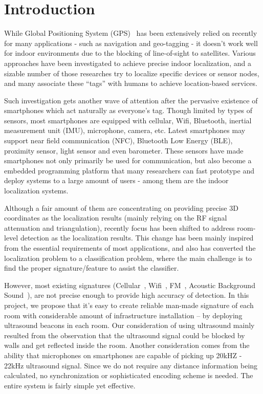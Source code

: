 \section{Introduction}
\label{sec:introduction}

While Global Positioning System (GPS)~\cite{hofmann1993global} has been extensively relied on recently for many applications - such as navigation and geo-tagging - it doesn't work well for indoor environments due to the blocking of line-of-sight to satellites. Various approaches have been investigated to achieve precise indoor localization, and a sizable number of those researches try to localize specific devices or sensor nodes, and many associate these ``tags'' with humans to achieve location-based services. 

Such investigation gets another wave of attention after the pervasive existence of smartphones which act naturally as everyone's tag. Though limited by types of sensors, most smartphones are equipped with cellular, Wifi, Bluetooth, inertial measurement unit (IMU), microphone, camera, etc. Latest smartphones may support near field communication (NFC), Bluetooth Low Energy (BLE), proximity sensor, light sensor and even barometer. These sensors have made smartphones not only primarily be used for communication, but also become a embedded programming platform that many researchers can fast prototype and deploy systems to a large amount of users - among them are the indoor localization systems.

Although a fair amount of them are concentrating on providing precise 3D coordinates as the localization results (mainly relying on the RF signal attenuation and triangulation), recently focus has been shifted to address room-level detection as the localization results. This change has been mainly inspired from the essential requirements of most applications, and also has converted the localization problem to a classification problem, where the main challenge is to find the proper signature/feature to assist the classifier.

However, most existing signatures (Cellular~\cite{otsason2005accurate}, Wifi~\cite{cheng2005accuracy}, FM~\cite{chen2012fm}, Acoustic Background Sound~\cite{tarzia2011indoor}), are not precise enough to provide high accuracy of detection. In this project, we propose that it's easy to create reliable man-made signature of each room with considerable amount of infrastructure installation -- by deploying ultrasound beacons in each room. Our consideration of using ultrasound mainly resulted from the observation that the ultrasound signal could be blocked by walls and get reflected inside the room. Another consideration comes from the ability that microphones on smartphones are capable of picking up 20kHZ - 22kHz ultrasound signal. Since we do not require any distance information being calculated, no synchronization or sophisticated encoding scheme is needed. The entire system is fairly simple yet effective.

